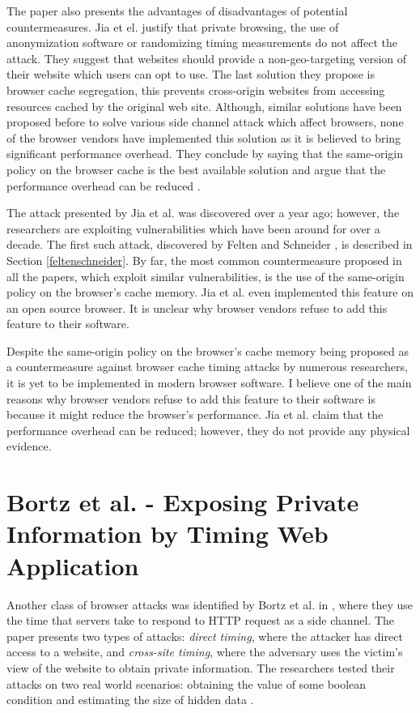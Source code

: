 \documentclass[10pt,a4paper,twoside]{book}
\begin{document}
The paper also presents the advantages of disadvantages of potential countermeasures. Jia et el. \cite{jia2015know} justify that private browsing, the use of anonymization software or randomizing timing measurements do not affect the attack. They suggest that websites should provide a non-geo-targeting version of their website which users can opt to use. The last solution they propose is browser cache segregation, this prevents cross-origin websites from accessing resources cached by the original web site. Although, similar solutions have been proposed before to solve various side channel attack which affect browsers, none of the browser vendors have implemented this solution as it is believed to bring significant performance overhead. They conclude by saying that the same-origin policy on the browser cache is the best available solution and argue that the performance overhead can be reduced \cite{jia2015know}.

The attack presented by Jia et al. \cite{jia2015know} was discovered over a year ago; however, the researchers are exploiting vulnerabilities which have been around for over a decade. The first such attack, discovered by Felten and Schneider \cite{felten2000timing}, is described in Section \ref{feltenschneider}. By far, the most common countermeasure proposed in all the papers, which exploit similar vulnerabilities, is the use of the same-origin policy on the browser's cache memory. Jia et al. \cite{jia2015know} even implemented this feature on an open source browser. It is unclear why browser vendors refuse to add this feature to their software. 

Despite the same-origin policy on the browser's cache memory being proposed as a countermeasure against browser cache timing attacks by numerous researchers, it is yet to be implemented in modern browser software. I believe one of the main reasons why browser vendors refuse to add this feature to their software is because it might reduce the browser's performance. Jia et al.\cite{jia2015know} claim that the performance overhead can be reduced; however, they do not provide any physical evidence.

\section{Bortz et al. - Exposing Private Information by Timing Web Application}
\label{bortz}
Another class of browser attacks was identified by Bortz et al. in \cite{bortz2007exposing}, where they use the time that servers take to respond to HTTP request as a side channel. The paper presents two types of attacks: \textit{direct timing}, where the attacker has direct access to a website, and \textit{cross-site timing}, where the adversary uses the victim's view of the website to obtain private information. The researchers tested their attacks on two real world scenarios: obtaining the value of some boolean condition and estimating the size of hidden data \cite{bortz2007exposing}.
\end{document}
